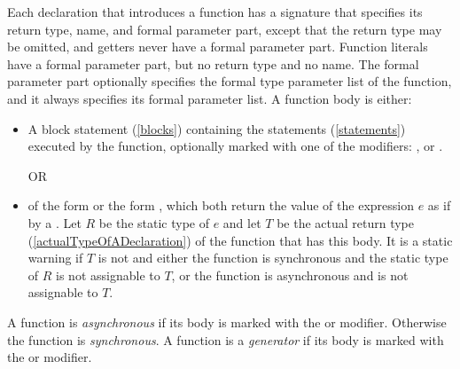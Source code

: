 \documentclass{article}
\begin{document}
\LMHash{}
Each declaration that introduces a function has a signature that specifies its return type, name, and formal parameter part,
except that the return type may be omitted, and getters never have a formal parameter part.
Function literals have a formal parameter part, but no return type and no name.
The formal parameter part optionally specifies the formal type parameter list of the function,
and it always specifies its formal parameter list.
A function body is either:
\begin{itemize}
\item A block statement (\ref{blocks}) containing the statements (\ref{statements}) executed by the function, optionally marked with one of the modifiers: \ASYNC, \ASYNC* or \SYNC*.


OR
\item of the form  or the form , which both return the value of the expression $e$ as if by a .
Let $R$ be the static type of $e$
and let $T$ be the actual return type (\ref{actualTypeOfADeclaration})
of the function that has this body.
It is a static warning if $T$ is not \VOID{} and either
the function is synchronous and the static type of $R$ is not assignable to $T$,
or the function is asynchronous and 
is not assignable to $T$.

\end{itemize}

\LMHash{}
A function is {\em asynchronous} if its body is marked with the \ASYNC{} or \ASYNC* modifier.
Otherwise the function is {\em synchronous}.
A function is a {\em generator} if its body is marked with the \SYNC* or \ASYNC* modifier.

\end{document}
